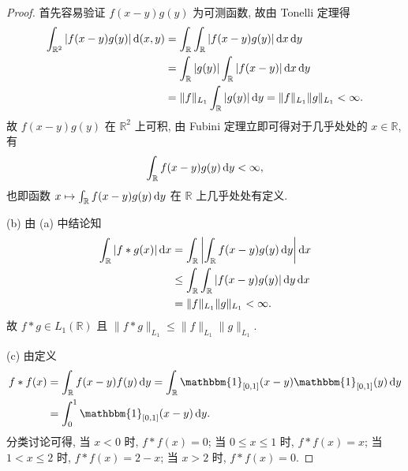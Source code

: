 \begin{proof}
    首先容易验证 $f(x-y)g(y)$ 为可测函数, 故由 Tonelli 定理得
    \begin{align*}
        \int_{\mathbb{R}^2} |f(x-y)g(y)|\mathop{}\!\mathrm{d}(x,y)
        & =\int_{\mathbb{R}}\int_{\mathbb{R}} |f(x-y)g(y)|\mathop{}\!\mathrm{d} x\mathop{}\!\mathrm{d} y \\
        & =\int_{\mathbb{R}}|g(y)|\int_{\mathbb{R}} |f(x-y)|\mathop{}\!\mathrm{d} x\mathop{}\!\mathrm{d} y \\
        & =\|f\|_{L_1}\int_{\mathbb{R}}|g(y)|\mathop{}\!\mathrm{d} y=\|f\|_{L_1}\|g\|_{L_1}<\infty.
    \end{align*}
    故 $f(x-y)g(y)$ 在 $\mathbb{R}^2$ 上可积, 由 Fubini 定理立即可得对于几乎处处的 $x\in\mathbb{R}$, 有
    \[\int_{\mathbb{R}}f(x-y)g(y)\mathop{}\!\mathrm{d} y<\infty,\]
    也即函数 $x\mapsto\int_{\mathbb{R}}f(x-y)g(y)\mathop{}\!\mathrm{d} y$ 在 $\mathbb{R}$ 上几乎处处有定义.

    (b) 由 (a) 中结论知
    \begin{align*}
        \int_{\mathbb{R}}|f*g(x)|\mathop{}\!\mathrm{d} x
        & =\int_{\mathbb{R}}\left|\int_{\mathbb{R}}f(x-y)g(y)\mathop{}\!\mathrm{d} y\right|\mathop{}\!\mathrm{d} x \\
        & \leq\int_{\mathbb{R}}\int_{\mathbb{R}}|f(x-y)g(y)|\mathop{}\!\mathrm{d} y\mathop{}\!\mathrm{d} x \\
        & =\|f\|_{L_1}\|g\|_{L_1}<\infty.
    \end{align*}
    故 $f*g\in L_1(\mathbb{R})$ 且 $\|f*g\|_{L_1}\leq\|f\|_{L_1}\|g\|_{L_1}$.

    (c) 由定义
    \begin{align*}
        f*f(x)
        & =\int_{\mathbb{R}} f(x-y)f(y)\diff y=\int_{\mathbb{R}} \mathbbm{1}_{[0,1]}(x-y)\mathbbm{1}_{[0,1]}(y)\diff y \\
        & =\int_0^1 \mathbbm{1}_{[0,1]}(x-y)\diff y.
    \end{align*}
    分类讨论可得, 当 $x<0$ 时, $f*f(x)=0$;
    当 $0\leq x\leq 1$ 时, $f*f(x)=x$;
    当 $1<x\leq 2$ 时, $f*f(x)=2-x$;
    当 $x>2$ 时, $f*f(x)=0$.
\end{proof}



